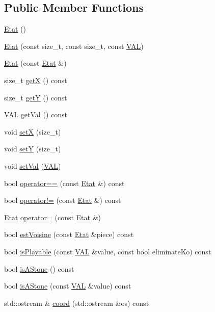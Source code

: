 \subsection*{Public Member Functions}
\begin{DoxyCompactItemize}
\item 
\hyperlink{class_etat_a44b4313a1a0bc0584a36be447802f2f4}{Etat} ()
\item 
\hyperlink{class_etat_a1e1232441c425f3f9adbf8cc99d9407e}{Etat} (const size\+\_\+t, const size\+\_\+t, const \hyperlink{class_etat_af3ddb2296ffc379b7f3ad2bf832f294e}{V\+AL})
\item 
\hyperlink{class_etat_a4e8da39ecb5b8edf66cc02addef85024}{Etat} (const \hyperlink{class_etat}{Etat} \&)
\item 
size\+\_\+t \hyperlink{class_etat_aa25e66b110bc835523819392435e78c6}{getX} () const
\item 
size\+\_\+t \hyperlink{class_etat_a3e3e915f2261c83989a983e84b1273c1}{getY} () const
\item 
\hyperlink{class_etat_af3ddb2296ffc379b7f3ad2bf832f294e}{V\+AL} \hyperlink{class_etat_ac0b81bbcf64cb3cc574e5a9dcdf94382}{get\+Val} () const
\item 
void \hyperlink{class_etat_ac020c4fe222274ac849a03fc8f19a99a}{setX} (size\+\_\+t)
\item 
void \hyperlink{class_etat_a8a54fc9ecb1b97d84d2f1f259e3bf70e}{setY} (size\+\_\+t)
\item 
void \hyperlink{class_etat_aa88987ca54aee676717f05e4570c0aec}{set\+Val} (\hyperlink{class_etat_af3ddb2296ffc379b7f3ad2bf832f294e}{V\+AL})
\item 
bool \hyperlink{class_etat_afa4f3f731268802b2a9c693cb738707b}{operator==} (const \hyperlink{class_etat}{Etat} \&) const
\item 
bool \hyperlink{class_etat_a676159ce9be48a79d647f93cd9faee6e}{operator!=} (const \hyperlink{class_etat}{Etat} \&) const
\item 
\hyperlink{class_etat}{Etat} \hyperlink{class_etat_ad400bb5d992ce25d27d56832fa0a9872}{operator=} (const \hyperlink{class_etat}{Etat} \&)
\item 
bool \hyperlink{class_etat_ab6e6b44dd68c041150332cee66dc74a3}{est\+Voisine} (const \hyperlink{class_etat}{Etat} \&piece) const
\item 
bool \hyperlink{class_etat_a2321679cabab0358adc8cf17dd119572}{is\+Playable} (const \hyperlink{class_etat_af3ddb2296ffc379b7f3ad2bf832f294e}{V\+AL} \&value, const bool eliminate\+Ko) const
\item 
bool \hyperlink{class_etat_a98cc204acc13280c277e2aa6a32a54ec}{is\+A\+Stone} () const
\item 
bool \hyperlink{class_etat_a64d8c0196e3e4de340726e2be29dec97}{is\+A\+Stone} (const \hyperlink{class_etat_af3ddb2296ffc379b7f3ad2bf832f294e}{V\+AL} \&value) const
\item 
std\+::ostream \& \hyperlink{class_etat_a9aa2a1b7274bc6d8a66fbec9655e47d0}{coord} (std\+::ostream \&os) const
\end{DoxyCompactItemize}


